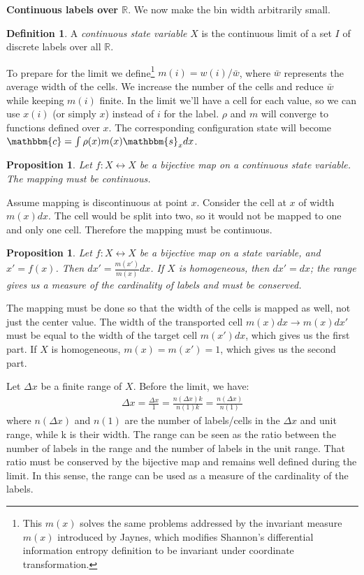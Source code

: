 \documentclass[aps,pra,10pt,twocolumn,floatfix,nofootinbib]{revtex4-1}
\newtheorem{prop}[thm]{Proposition}
\theoremstyle{definition}
\newtheorem{defn}[thm]{Definition}
\begin{document}
\textbf{Continuous labels over $\mathbb{R}$}. We now make the bin width arbitrarily small.

\begin{defn}\label{continuousLabels}
A \emph{continuous state variable} $X$ is the continuous limit of a set $I$ of discrete labels over all $\mathbb{R}$.
\end{defn}

To prepare for the limit we define\footnote{This $m(x)$ solves the same problems addressed by the invariant measure $m(x)$ introduced by Jaynes\cite{Jaynes}, which modifies Shannon's differential information entropy definition\cite{Shannon} to be invariant under coordinate transformation.} $m(i)=w(i)/\bar{w}$, where $\bar{w}$ represents the average width of the cells. We increase the number of the cells and reduce $\bar{w}$ while keeping $m(i)$ finite. In the limit we'll have a cell for each value, so we can use $x(i)$ (or simply $x$) instead of $i$ for the label. $\rho$ and $m$ will converge to functions defined over $x$. The corresponding configuration state will become $\mathbbm{c}=\int \rho(x) m(x) \mathbbm{s}_x dx$.

\begin{prop}\label{continuousMapping}
Let $f: X \leftrightarrow X$ be a bijective map on a continuous state variable. The mapping must be continuous.
\end{prop}
Assume mapping is discontinuous at point $x$. Consider the cell at $x$ of width $m(x)dx$. The cell would be split into two, so it would not be mapped to one and only one cell. Therefore the mapping must be continuous.

\begin{prop}\label{widthMapping}
Let $f: X \leftrightarrow X$ be a bijective map on a state variable, and $x'=f(x)$. Then $dx' = \frac{m(x')}{m(x)} dx$. If $X$ is homogeneous, then $dx' = dx$; the range gives us a measure of the cardinality of labels and must be conserved.
\end{prop}
The mapping must be done so that the width of the cells is mapped as well, not just the center value. The width of the transported cell $m(x)dx \rightarrow m(x) dx'$ must be equal to the width of the target cell $m(x')dx$, which gives us the first part. If $X$ is homogeneous, $m(x)=m(x')=1$, which gives us the second part.

Let $\Delta x$ be a finite range of $X$. Before the limit, we have:
\begin{align*}
\Delta x = \frac{\Delta x}{1} = \frac{n(\Delta x) k}{n(1) k} = \frac{n(\Delta x)}{n(1)}
\end{align*}
where $n(\Delta x)$ and $n(1)$ are the number of labels/cells in the $\Delta x$ and unit range, while k is their width. The range can be seen as the ratio between the number of labels in the range and the number of labels in the unit range. That ratio must be conserved by the bijective map and remains well defined during the limit. In this sense, the range can be used as a measure of the cardinality of the labels.
\end{document}
